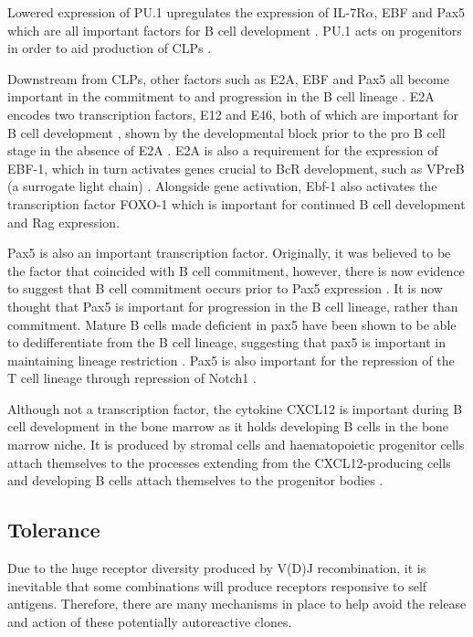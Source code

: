 Lowered expression of PU.1 upregulates the expression of IL-7R$\alpha$, EBF and Pax5 which are all important factors for B cell development \citep{Hagman2006}.
PU.1 acts on progenitors in order to aid production of CLPs \citep{Hagman2006}.

Downstream from CLPs, other factors such as E2A, EBF and Pax5 all become important in the commitment to and progression in the B cell lineage \citep{Mansson2008}.
E2A encodes two transcription factors, E12 and E46, both of which are important for B cell development \citep{Bain1997}, shown by the developmental block prior to the pro B cell stage in the absence of E2A \citep{Bain1994}.
E2A is also a requirement for the expression of EBF-1, which in turn activates genes crucial to BcR development, such as VPreB (a surrogate light chain) \citep{Welinder2011}.
Alongside gene activation, Ebf-1 also activates the transcription factor FOXO-1 which is important for continued B cell development and Rag expression\citep{Amin2008}.

Pax5 is also an important transcription factor.
Originally, it was believed to be the factor that coincided with B cell commitment, however, there is now evidence to suggest that B cell commitment occurs prior to Pax5 expression \citep{Mansson2008}.
It is now thought that Pax5 is important for progression in the B cell lineage, rather than commitment.
Mature B cells made deficient in pax5 have been shown to be able to dedifferentiate from the B cell lineage, suggesting that pax5 is important in maintaining lineage restriction \citep{Cobaleda2007}.
Pax5 is also important for the repression of the T cell lineage through repression of Notch1 \citep{Souabni2002}.

Although not a transcription factor, the cytokine CXCL12 is important during B cell development in the bone marrow as it holds developing B cells in the bone marrow niche.
It is produced by stromal cells and haematopoietic progenitor cells attach themselves to the processes extending from the CXCL12-producing cells and developing B cells attach themselves to the progenitor bodies \citep{Tokoyoda2004}.

\subsection{Tolerance}

Due to the huge receptor diversity produced by V(D)J recombination, it is inevitable that some combinations will produce receptors responsive to self antigens.
Therefore, there are many mechanisms in place to help avoid the release and action of these potentially autoreactive clones.

